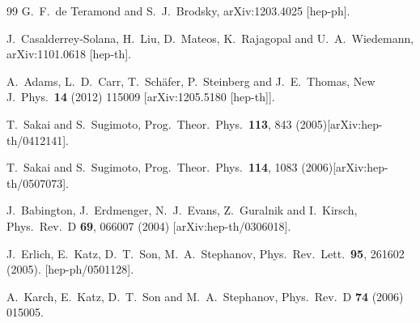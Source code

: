 \documentclass[aps,prd,showpacs,preprintnumbers,twocolumn]{revtex4}
\begin{document}
\begin{thebibliography}{99}
  G.~F.~de Teramond and S.~J.~Brodsky,
  arXiv:1203.4025 [hep-ph].

  J.~Casalderrey-Solana, H.~Liu, D.~Mateos, K.~Rajagopal and U.~A.~Wiedemann,
  arXiv:1101.0618 [hep-th].



  A.~Adams, L.~D.~Carr, T.~Schäfer, P.~Steinberg and J.~E.~Thomas,
  New J.\ Phys.\  {\bf 14} (2012) 115009
  [arXiv:1205.5180 [hep-th]].

 T.~Sakai and S.~Sugimoto,
Prog.\ Theor.\ Phys.\ \textbf{113}, 843 (2005)[arXiv:hep-th/0412141].

 T.~Sakai and S.~Sugimoto,
Prog.\ Theor.\ Phys.\ \textbf{114}, 1083 (2006)[arXiv:hep-th/0507073].

J.~Babington, J.~Erdmenger, N.~J.~Evans, Z.~Guralnik and
I.~Kirsch,
Phys.\ Rev.\ D \textbf{69}, 066007 (2004) [arXiv:hep-th/0306018].



  J.~Erlich, E.~Katz, D.~T.~Son, M.~A.~Stephanov,
  Phys.\ Rev.\ Lett.\  {\bf 95}, 261602 (2005).
  [hep-ph/0501128].

  A.~Karch, E.~Katz, D.~T.~Son and M.~A.~Stephanov,
 Phys.\ Rev.\ D {\bf 74} (2006) 015005.


\end{thebibliography}
\end{document}
